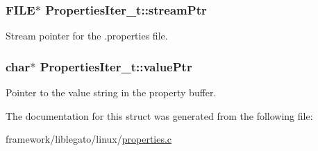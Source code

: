 \subsubsection[{\texorpdfstring{stream\+Ptr}{streamPtr}}]{\setlength{\rightskip}{0pt plus 5cm}F\+I\+LE$\ast$ Properties\+Iter\+\_\+t\+::stream\+Ptr}\hypertarget{struct_properties_iter__t_a024d5045e7a21e56ee3afb032f332484}{}\label{struct_properties_iter__t_a024d5045e7a21e56ee3afb032f332484}


Stream pointer for the .properties file. 

\subsubsection[{\texorpdfstring{value\+Ptr}{valuePtr}}]{\setlength{\rightskip}{0pt plus 5cm}char$\ast$ Properties\+Iter\+\_\+t\+::value\+Ptr}\hypertarget{struct_properties_iter__t_a65764e581669dca366097828bd810c4f}{}\label{struct_properties_iter__t_a65764e581669dca366097828bd810c4f}


Pointer to the value string in the property buffer. 



The documentation for this struct was generated from the following file\+:\begin{DoxyCompactItemize}
\item 
framework/liblegato/linux/\hyperlink{properties_8c}{properties.\+c}\end{DoxyCompactItemize}

